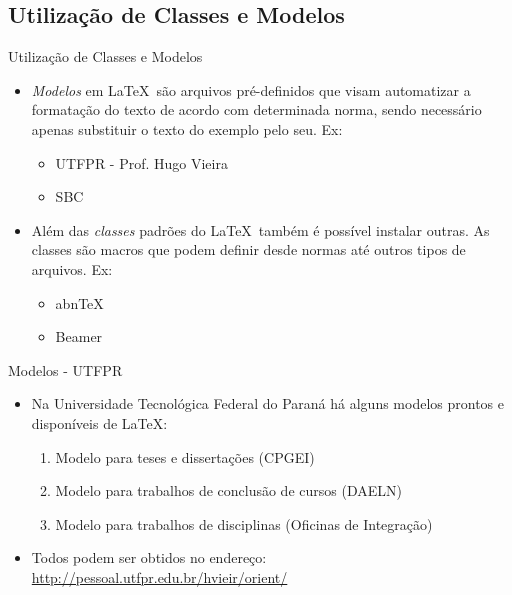 \subsection{Utilização de Classes e Modelos}

\begin{frame}{Utilização de Classes e Modelos}

  \begin{itemize}
    \item \textit{Modelos} em \LaTeX\ são arquivos pré-definidos que visam automatizar a formatação do texto de acordo com determinada norma, sendo necessário apenas substituir o texto do exemplo pelo seu. Ex:
    \begin{itemize}
    \item UTFPR - Prof. Hugo Vieira
    \item SBC
    \end{itemize}

    \vspace{0.5cm}
    
    \item Além das \textit{classes} padrões do \LaTeX\ também é possível instalar outras. As classes são macros que podem definir desde normas até outros tipos de arquivos. Ex:
    \begin{itemize}
    \item abn\TeX
    \item Beamer
    \end{itemize}
    
    \end{itemize}
\end{frame}

\begin{frame}{Modelos - UTFPR}
 
    \begin{itemize}
    \item Na Universidade Tecnológica Federal do Paraná há alguns modelos prontos e disponíveis de \LaTeX:
        \begin{enumerate}
        \item Modelo para teses e dissertações (CPGEI) 
        \item Modelo para trabalhos de conclusão de cursos (DAELN) 
        \item Modelo para trabalhos de disciplinas (Oficinas de Integração) 
        \end{enumerate}
    \item Todos podem ser obtidos no endereço: \url{http://pessoal.utfpr.edu.br/hvieir/orient/}
    \end{itemize}

\end{frame}


